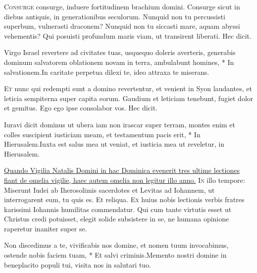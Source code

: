 \begin{multicols*}{2}
\begin{responsory}
\end{responsory}
\lettrine[lines=2]{\zallmancaps \color{Red} C}{onsurge} consurge, induere fortitudinem brachium domini. Consurge sicut in diebus antiquis, in generationibus seculorum. Nunquid non tu percussisti superbum, vulnerasti draconem? Nunquid non tu siccasti mare, aquam abyssi vehementis? Qui posuisti profundum maris viam, ut transirent liberati. Hec dicit.
\begin{responsory}
{Virgo Israel revertere ad civitates tuas, usquequo doleris averteris, generabis dominum salvatorem oblationem novam in terra, ambulabunt homines, * In salvationem.}{In caritate perpetua dilexi te, ideo attraxa te miserans.}
\end{responsory}
\lettrine[lines=2]{\zallmancaps \color{Blue} E}{t} nunc qui redempti sunt a domino revertentur, et venient in Syon laudantes, et leticia
sempiterna super capita eorum. Gaudium et leticiam tenebunt, fugiet dolor et gemitus. Ego ego ipse consolabor vos. Hec dicit.
\begin{responsory-doxology}
{Iuravi dicit dominus ut ubera iam non irascar super terram, montes enim et colles suscipient iusticiam meam, et testamentum pacis erit, * In Hierusalem.}{Iuxta est salus mea ut veniat, et iusticia mea ut reveletur, in Hierusalem.}
\end{responsory-doxology}
\newline \ul{Quando Vigilia Natalis Domini in hac Dominica evenerit tres ultime lectiones fiant de omelia vigilie, haec autem omelia non legitur illo anno.}
\lettrine[lines=2]{\zallmancaps \color{Red} I}{n} illo tempore: Miserunt Iudei ab Iherosolimis sacerdotes et Levitas ad Iohannem, ut interrogarent eum, tu quis es. Et reliqua.
\lettrine[lines=2]{\zallmancaps \color{Blue} E}{x} huius nobis lectionis verbis fratres karissimi Iohannis humilitas commendatur. Qui cum tante virtutis esset ut Christus credi potuisset, elegit solide subsistere in se, ne humana opinione raperetur inaniter super se.
\begin{responsory}
{Non discedimus a te, vivificabis nos domine, et nomen tuum invocabimus, ostende nobis faciem tuam, * Et salvi criminis.}{Memento nostri domine in beneplacito populi tui, visita nos in salutari tuo.}

\end{responsory}
\end{multicols*}
